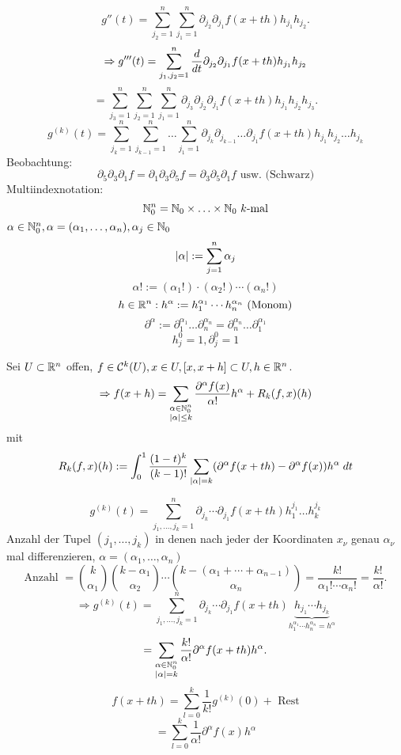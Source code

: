 \documentclass[../ana2.tex]{subfiles}
\begin{document}
\[ g''(t) = \sum_{j_2=1}^n \sum_{j_1=1}^n 
\partial_{j_2} \partial_{j_1} f(x + th) h_{j_1} h_{j_2}. \]
\[ \Rightarrow g'''(t) = \sum_{j_1,j_2 = 1}^n 
\ddx{t} \partial_{j_2} \partial_{j_1} f(x + th) h_{j_1} h_{j_2} \]
\[ = \sum_{j_3 = 1}^n\sum_{j_2 = 1}^n \sum_{j_1=1}^n \partial_{j_3} \partial_{j_2} \partial_{j_1}
f(x + th) h_{j_1} h_{j_2} h_{j_3}. \]
\[ g^{(k)}(t) = \sum_{j_k=1}^n \sum_{j_{k-1}=1}^n \ldots \sum_{j_{1}=1}^n 
\partial_{j_k}\partial_{j_{k-1}}\ldots\partial_{j_1} f(x+th)h_{j_1}h_{j_2}\ldots h_{j_k} \]
Beobachtung: 
\[ \partial_5 \partial_3 \partial_1f  = \partial_1 \partial_3 \partial_5 f
= \partial_3 \partial_5 \partial_1 f \text{ usw. (Schwarz)} \]
Multiindexnotation:
\[ \N_0^n = \N_0 \times \ldots \times \N_0 \ k\text{-mal} \]
\( \alpha \in \N_0^n, \alpha =(\alpha_1, \ldots, \alpha_n), \alpha_j \in \N_0 \)
\[ \abs{\alpha} := \sum_{j=1}^n \alpha_j \]
\[ \alpha! := (\alpha_1!) \cdot (\alpha_2!) \cdots (\alpha_n!) \]
\[ h \in \R^n: h^\alpha := h_1^{\alpha_1} \cdots h_n^{\alpha_n} \text{ (Monom)} \]
\[ \partial^\alpha := \partial_1^{\alpha_1}\ldots \partial_n^{\alpha_n}
= \partial_n^{\alpha_n}\ldots\partial_1^{\alpha_1} \]
\[ h_j^0 = 1, \partial_j^0 = 1 \]
\begin{satz}
    Sei \( U \subset \R^n \) offen, \( f \in \mathcal{C}^k(U), 
    x \in U, [x,x+h] \subset U, h \in \R^n \).
    \[ \Rightarrow f(x + h) = \sum_{\substack{\alpha \in \N_0^n \\ \abs{\alpha} \leq k}} 
    \frac{ \partial^\alpha f(x) }{\alpha!} h^\alpha 
    + R_k(f, x)(h) \]
    mit 
    \[R_k(f,x)(h) := \integralx{\frac{(1-t)^k}{(k-1)!} 
    \sum_{\abs{\alpha} = k} 
    (\partial^\alpha f(x+th)-\partial^\alpha f(x))h^\alpha}{0}{1}{t}\]
\end{satz}
\begin{bew}
    \[ g^{(k)}(t) = \sum_{j_1,\ldots, j_k = 1}^n 
    \partial_{j_k}\cdots \partial_{j_1} f(x+th)h_1^{j_1}\ldots h_k^{j_k} \]
    Anzahl der Tupel \( (j_1, \ldots, j_k) \) 
    in denen nach jeder der Koordinaten 
    \( x_\nu \) genau \( \alpha_\nu \) mal differenzieren, 
    \( \alpha = (\alpha_1, \ldots, \alpha_n) \) \\
    \[ \text{Anzahl } = \binom{k}{\alpha_1} \binom{k - \alpha_1}{\alpha_2} \cdots 
    \binom{k - (\alpha_1 + \cdots + \alpha_{n-1})}{\alpha_n}
    = \frac{ k! }{\alpha_1! \cdots \alpha_n!} 
    = \frac{k!}{\alpha!}. \]
    \[ \Rightarrow g^{(k)}(t) = \sum_{j_1,\ldots,j_k = 1}^n 
    \partial_{j_k}\cdots\partial_{j_1} f(x+th) 
    \underbrace{h_{j_1}\cdots h_{j_k}}_{h_1^{\alpha_1}\cdots h_n^{\alpha_n} = h^\alpha} \]
    \[ = \sum_{\substack{\alpha \in \N_0^n\\ \abs{\alpha}=k}} \frac{k!}{\alpha!}
    \partial^\alpha f(x+th) h^\alpha. \]
    \[ f(x + th) = \sum_{l=0}^k \frac{1}{k!} g^{(k)}(0) + \text{ Rest} \]
    \[ = \sum_{l=0}^k \frac{1}{\alpha!} \partial^\alpha f(x) h^\alpha \]
\end{bew}
\end{document}
